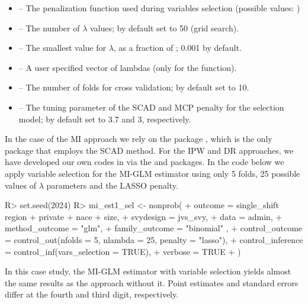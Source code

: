 \documentclass[
]{jss}
\begin{document}
\begin{itemize}
\item {} -- The penalization function used during variables selection (possible values: )
\item {} -- The number of $\lambda$ values; by default set to 50 (grid search).
\item {} -- The smallest value for $\lambda$, as a fraction of ; 0.001 by default.
\item {} -- A user specified vector of lambdas (only for the  function).
\item {} -- The number of folds for cross validation; by default set to 10.
\item {} -- The tuning parameter of the SCAD and MCP penalty for the selection model; by default set to 3.7 and 3, respectively.
\end{itemize}

In the case of the MI approach we rely on the  package
\citep{ncvreg}, which is the only  package that employs the
SCAD method. For the IPW and DR approaches, we have developed our own
codes in  via the  and 
packages. In the code below we apply variable selection for the MI-GLM
estimator using only 5 folds, 25 possible values of \(\lambda\)
parameters and the LASSO penalty.

\begin{CodeChunk}
\begin{CodeInput}
R> set.seed(2024)
R> mi_est1_sel <- nonprob(
+   outcome = single_shift ~ region + private + nace + size,
+   svydesign = jvs_svy,
+   data = admin,
+   method_outcome = "glm",
+   family_outcome = "binomial" ,
+   control_outcome = control_out(nfolds = 5, nlambda = 25, penalty = "lasso"),
+   control_inference = control_inf(vars_selection = TRUE),
+   verbose = TRUE
+ )
\end{CodeInput}
\end{CodeChunk}

In this case study, the MI-GLM estimator with variable selection yields
almost the same results as the approach without it. Point estimates and
standard errors differ at the fourth and third digit, respectively.
\end{document}
